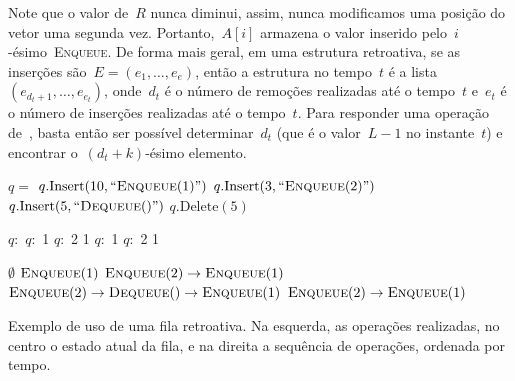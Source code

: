 \documentclass[main.tex]{subfiles}
\begin{document}
Note que o valor de~$R$ nunca diminui, assim, nunca modificamos uma posição do vetor uma segunda vez. Portanto,~$A[i]$ armazena o valor inserido pelo~$i$-ésimo~\textsc{Enqueue}. De forma mais geral, em uma estrutura retroativa, se as inserções são~$E = (e_1, \ldots, e_e)$, então a estrutura no tempo~$t$ é a lista~$(e_{d_t+1}, \ldots, e_{e_t})$, onde~$d_t$ é o número de remoções realizadas até o tempo~$t$ e~$e_t$ é o número de inserções realizadas até o tempo~$t$. Para responder uma operação de~, basta então ser possível determinar~$d_t$ (que é o valor~$L - 1$ no instante~$t$) e encontrar o~$(d_t + k)$-ésimo elemento.

\begin{table}
\centering

\begin{subalgorithm}{0.34\textwidth}
\begin{algorithmic}

	\State $q =$ 
	\State $q.\text{Insert}(10, ``\Call{Enqueue}{1}")$
	\State $q.\text{Insert}(3, ``\Call{Enqueue}{2}")$
	\State $q.\text{Insert}(5, ``\Call{Dequeue}{\null}")$
	\State $q.\text{Delete}(5)$

\end{algorithmic}
\end{subalgorithm} \vrule
\begin{subalgorithm}{0.14\textwidth}
\begin{algorithmic}

	\State $q:$
	\State $q:$ 1
	\State $q:$ 2 1
	\State $q:$ 1
	\State $q:$ 2 1

\end{algorithmic}
\end{subalgorithm} \vrule
\begin{subalgorithm}{0.5\textwidth}
\begin{algorithmic}

	\State $\emptyset$
	\State $\Call{Enqueue}{1}$
	\State $\Call{Enqueue}{2} \rightarrow \Call{Enqueue}{1}$
	\State $\Call{Enqueue}{2} \rightarrow \Call{Dequeue}{\null} \rightarrow \Call{Enqueue}{1}$
	\State $\Call{Enqueue}{2} \rightarrow \Call{Enqueue}{1}$

\end{algorithmic}
\end{subalgorithm}
\caption{Exemplo de uso de uma fila retroativa. Na esquerda, as operações realizadas, no centro o estado atual da fila, e na direita a sequência de operações, ordenada por tempo.} \label{ex:fila_retro}
\end{table}
\end{document}
